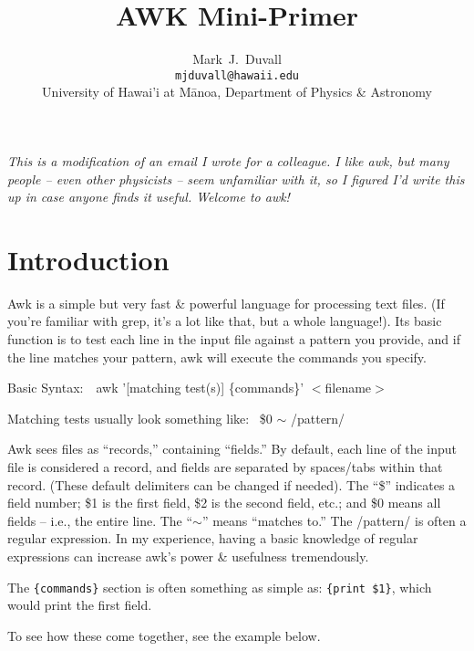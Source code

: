 \documentclass[10pt]{article}
\begin{document}
\title{AWK Mini-Primer}
\author{Mark~J.~Duvall\\
\texttt{mjduvall@hawaii.edu}\\
University of Hawai'i at M\={a}noa, Department of Physics \& Astronomy}
\date{}
\maketitle




\emph{This is a modification of an email I wrote for a colleague. I like awk, but many people -- even other physicists -- seem unfamiliar with it, so I figured I'd write this up in case anyone finds it useful. Welcome to awk!}


\section*{Introduction}


Awk is a simple but very fast \& powerful language for processing text files. (If you're familiar with grep, it's a lot like that, but a whole language!). Its basic function is to test each line in the input file against a pattern you provide, and if the line matches your pattern, awk will execute the commands you specify.


Basic Syntax: \,\, \ttfamily awk '[matching test(s)] \{commands\}' $<$filename$>$ \normalfont

Matching tests usually look something like:  \,  \$0 $\sim$ /pattern/

Awk sees files as ``records,'' containing ``fields.'' By default, each line of the input file is considered a record, and fields are separated by spaces/tabs within that record. (These default delimiters can be changed if needed). The ``\$'' indicates a field number; \$1 is the first field, \$2 is the second field, etc.; and \$0 means all fields -- i.e., the entire line. The ``$\sim$'' means ``matches to.'' The /pattern/ is often a regular expression. In my experience, having a basic knowledge of regular expressions can increase awk's power \& usefulness tremendously.

The \texttt{\{commands\}} section is often something as simple as:    \texttt{\{print \$1\}}, which would print the first field.

To see how these come together, see the example below.


\pagebreak
\end{document}

